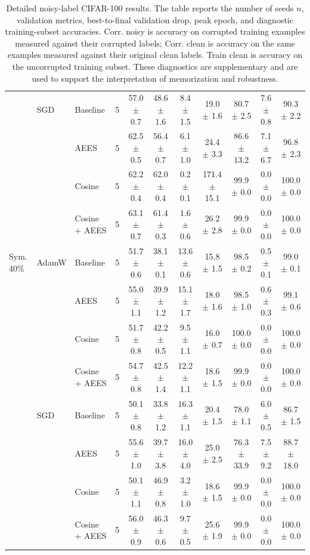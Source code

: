 \begin{table}[htbp]
{\begin{tabular}{lllcccccccc}
 & SGD & Baseline & 5 & 57.0 $\pm$ 0.7 & 48.6 $\pm$ 1.6 & 8.4 $\pm$ 1.5 & 19.0 $\pm$ 1.6 & 80.7 $\pm$ 2.5 & 7.6 $\pm$ 0.8 & 90.3 $\pm$ 2.2 \\
 &  & AEES & 5 & 62.5 $\pm$ 0.5 & 56.4 $\pm$ 0.7 & 6.1 $\pm$ 1.0 & 24.4 $\pm$ 3.3 & 86.6 $\pm$ 13.2 & 7.1 $\pm$ 6.7 & 96.8 $\pm$ 2.3 \\
 &  & Cosine & 5 & 62.2 $\pm$ 0.4 & 62.0 $\pm$ 0.4 & 0.2 $\pm$ 0.1 & 171.4 $\pm$ 15.1 & 99.9 $\pm$ 0.0 & 0.0 $\pm$ 0.0 & 100.0 $\pm$ 0.0 \\
 &  & Cosine + AEES & 5 & 63.1 $\pm$ 0.7 & 61.4 $\pm$ 0.3 & 1.6 $\pm$ 0.6 & 26.2 $\pm$ 2.8 & 99.9 $\pm$ 0.0 & 0.0 $\pm$ 0.0 & 100.0 $\pm$ 0.0 \\
\midrule
Sym. 40\% & AdamW & Baseline & 5 & 51.7 $\pm$ 0.6 & 38.1 $\pm$ 0.1 & 13.6 $\pm$ 0.6 & 15.8 $\pm$ 1.5 & 98.5 $\pm$ 0.2 & 0.5 $\pm$ 0.1 & 99.0 $\pm$ 0.1 \\
 &  & AEES & 5 & 55.0 $\pm$ 1.1 & 39.9 $\pm$ 1.2 & 15.1 $\pm$ 1.7 & 18.0 $\pm$ 1.6 & 98.5 $\pm$ 1.0 & 0.6 $\pm$ 0.3 & 99.1 $\pm$ 0.6 \\
 &  & Cosine & 5 & 51.7 $\pm$ 0.8 & 42.2 $\pm$ 0.5 & 9.5 $\pm$ 1.1 & 16.0 $\pm$ 0.7 & 100.0 $\pm$ 0.0 & 0.0 $\pm$ 0.0 & 100.0 $\pm$ 0.0 \\
 &  & Cosine + AEES & 5 & 54.7 $\pm$ 0.8 & 42.5 $\pm$ 1.4 & 12.2 $\pm$ 1.1 & 18.6 $\pm$ 1.5 & 99.9 $\pm$ 0.0 & 0.0 $\pm$ 0.0 & 100.0 $\pm$ 0.0 \\
 & SGD & Baseline & 5 & 50.1 $\pm$ 0.8 & 33.8 $\pm$ 1.2 & 16.3 $\pm$ 1.1 & 20.4 $\pm$ 1.5 & 78.0 $\pm$ 1.1 & 6.0 $\pm$ 0.5 & 86.7 $\pm$ 1.5 \\
 &  & AEES & 5 & 55.6 $\pm$ 1.0 & 39.7 $\pm$ 3.8 & 16.0 $\pm$ 4.0 & 25.0 $\pm$ 2.5 & 76.3 $\pm$ 33.9 & 7.5 $\pm$ 9.2 & 88.7 $\pm$ 18.0 \\
 &  & Cosine & 5 & 50.1 $\pm$ 1.1 & 46.9 $\pm$ 0.8 & 3.2 $\pm$ 1.0 & 18.6 $\pm$ 1.5 & 99.9 $\pm$ 0.0 & 0.0 $\pm$ 0.0 & 100.0 $\pm$ 0.0 \\
 &  & Cosine + AEES & 5 & 56.0 $\pm$ 0.9 & 46.3 $\pm$ 0.6 & 9.7 $\pm$ 0.5 & 25.6 $\pm$ 1.9 & 99.9 $\pm$ 0.0 & 0.0 $\pm$ 0.0 & 100.0 $\pm$ 0.0 \\
\bottomrule
\end{tabular}
}
\caption{Detailed noisy-label CIFAR-100 results. The table reports the number of seeds $n$, validation metrics, best-to-final validation drop, peak epoch, and diagnostic training-subset accuracies. Corr. noisy is accuracy on corrupted training examples measured against their corrupted labels; Corr. clean is accuracy on the same examples measured against their original clean labels. Train clean is accuracy on the uncorrupted training subset. These diagnostics are supplementary and are used to support the interpretation of memorization and robustness.}
\label{tab:cifar_noisy_detailed_appendix}
\end{table}